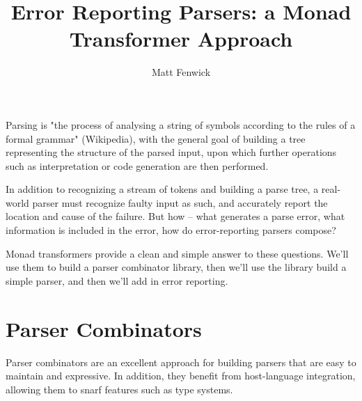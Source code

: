\documentclass{tmr}
\title{Error Reporting Parsers:  a Monad Transformer Approach}
\author{Matt Fenwick\email{mfenwick100@gmail.com}}
\begin{document}
\begin{introduction}
Parsing is "the process of analysing a string of symbols according to the rules
of a formal grammar" (Wikipedia), with the general goal of building a tree
representing the structure of the parsed input, upon which further operations
such as interpretation or code generation are then performed.

In addition to recognizing a stream of tokens and building a parse tree, a
real-world parser must recognize faulty input as such, and accurately report the
location and cause of the failure.  But how -- what generates a parse error,
what information is included in the error, how do error-reporting parsers
compose?

Monad transformers provide a clean and simple answer to these questions.
We'll use them to build a parser combinator library, then we'll use the library
build a simple parser, and then we'll add in error reporting.
\end{introduction}


\section{Parser Combinators}
Parser combinators are an excellent approach for building parsers that are easy
to maintain and expressive.  In addition, they benefit from host-language
integration, allowing them to snarf features such as type systems.
\end{document}
